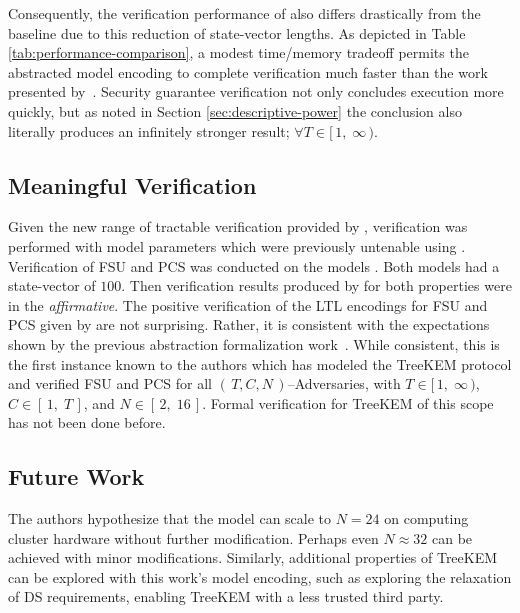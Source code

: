 \documentclass[authordraft,sigconf]{acmart}
\newcommand{\Abrev}[1]{\gls{#1}}
\newcommand{\NumericRange}[2]{\ensuremath{\left[\,#1,\; #2\,\right]}\xspace}
\newcommand{\NumericRangeOpenR}[2]{\ensuremath{[\,#1,\; #2\,)}\xspace}
\begin{document}
Consequently, the verification performance of  also differs drastically from the baseline  due to this reduction of state-vector lengths.
As depicted in Table \ref{tab:performance-comparison}, a modest time/memory tradeoff permits the abstracted model encoding to complete verification much faster than the work presented by~\cite{washburn2022formal}.
Security guarantee verification not only concludes execution more quickly, but as noted in Section \ref{sec:descriptive-power} the conclusion also literally produces an infinitely stronger result; $\forall T \in \NumericRangeOpenR{1}{\infty}$.


\subsection{Meaningful Verification}

Given the new range of tractable verification provided by , verification was performed with model parameters which were previously untenable using . 
Verification of  \Abrev{FSU} and \Abrev{PCS} was conducted on the models .
Both models had a state-vector of $100$\siBytes.
Then verification results produced by   for both properties were in the \emph{affirmative}.
The positive verification of the LTL encodings for \Abrev{FSU} and \Abrev{PCS} given by  are not surprising.
Rather, it is consistent with the expectations shown by the previous \CGKAdef abstraction formalization work~\cite{alwen2020security}.
While consistent, this is the first instance known to the authors which has modeled the TreeKEM protocol and verified \Abrev{FSU} and \Abrev{PCS} for all $(\,T, C, N\,)$--Adversaries, with $T \in \NumericRangeOpenR{1}{\infty}$, $C \in \NumericRange{1}{T}$, and $N \in \NumericRange{2}{16}$.
Formal verification for TreeKEM of this scope has not been done before.


\subsection{Future Work}

The authors hypothesize that the model   can scale to $N = 24$ on computing cluster hardware without further modification.
Perhaps even $N \approx 32$ can be achieved with minor modifications.
Similarly, additional properties of TreeKEM can be explored with this work's model encoding, such as exploring the relaxation of  \Abrev{DS} requirements, enabling TreeKEM with a less trusted third party.
\end{document}
